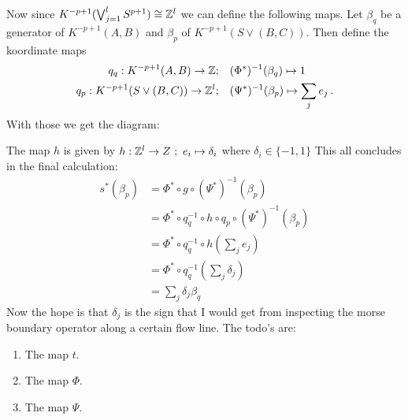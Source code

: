 \begin{cor}
	Now since  $K^{-p+1}(\bigvee _{j=1}^lS^{p+1})\cong \mathbb{Z}^l$ we can define the following maps. Let $\beta_q$ be a generator of $K^{-p+1}(A,B)$ and $\beta_p$ of $K^{-p+1}(S\vee (B,C))$. Then define the koordinate maps 
	\begin{align*}
		q_q: K^{-p+1}(A,B) \to \mathbb{Z};\quad & (\Phi^*)^{-1}(\beta_q)\mapsto 1 \\
		q_p: K^{-p+1}(S\vee(B,C)) \to \mathbb{Z}^l;\quad & (\Psi^*)^{-1}(\beta_p)\mapsto \sum_j e_j \, . 
	\end{align*}
	With those we get the diagram: 
	\begin{center}
	\end{center}The map $h$ is given by $h:\mathbb{Z}^l\to Z~;~ e_i\mapsto \delta_i$ where $\delta_i\in \{-1,1\}$
	This all concludes in the final calculation: 
	\begin{align*}
		s^*(\beta_p) 
		&= \Phi^*\circ  g\circ (\Psi^*)^{-1}(\beta_p)\\
		&= \Phi^*\circ  q_q^{-1}\circ h \circ q_p \circ (\Psi^*)^{-1}(\beta_p)\\
		&= \Phi^*\circ  q_q^{-1}\circ h (\sum_j e_j)\\
		&= \Phi^*\circ  q_q^{-1} (\sum_j \delta_j )\\
		&= \sum_j \delta_j \beta_q
	\end{align*}
	Now the hope is that $\delta_j$ is the sign that I would get from inspecting the morse boundary operator along a certain flow line. 
	The todo's are:
	\begin{enumerate}
		\item The map $t$.
		\item The map $\Phi$.
		\item The map $\Psi$.

\end{enumerate}
\end{cor}
